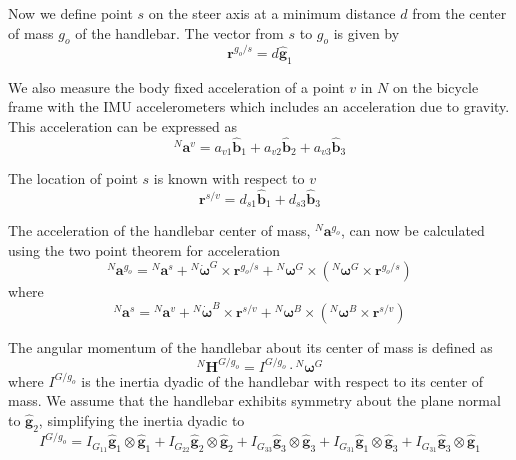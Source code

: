 \documentclass[10pt]{article}
\begin{document}
Now we define point $s$ on the steer axis at a minimum distance $d$ from the
center of mass $g_o$ of the handlebar. The vector from $s$ to $g_o$ is given by 
%
\begin{equation}
  \mathbf{r}^{g_o/s} = d\hat{\mathbf{g}}_1
\end{equation}

We also measure the body fixed acceleration of a point $v$ in $N$ on the
bicycle frame with the IMU accelerometers which includes an acceleration due to
gravity. This acceleration can be expressed as
%
\begin{equation}
  ^N\mathbf{a}^v =
    a_{v1}\hat{\mathbf{b}}_1 +
    a_{v2}\hat{\mathbf{b}}_2 +
    a_{v3}\hat{\mathbf{b}}_3
  \label{eq:acceleration-of-v}
\end{equation}

The location of point $s$ is known with respect to $v$ 
%
\begin{equation}
  \mathbf{r}^{s/v} = d_{s1}\hat{\mathbf{b}}_1 + d_{s3}\hat{\mathbf{b}}_3
\end{equation}

The acceleration of the handlebar center of mass, $^N\mathbf{a}^{g_o}$, can now
be calculated using the two point theorem for acceleration \cite{Kane1985}
%
\begin{equation}
  ^N\mathbf{a}^{g_o} = {}^N\mathbf{a}^s +
    {}^N\dot{\boldsymbol{\omega}}^G\times\mathbf{r}^{g_o/s} +
    {}^N\boldsymbol{\omega}^G\times({}^N\boldsymbol{\omega}^G\times\mathbf{r}^{g_o/s})
\end{equation}
where
\begin{equation}
  ^N\mathbf{a}^s = {}^N\mathbf{a}^v +
    {}^N\dot{\boldsymbol{\omega}}^B\times\mathbf{r}^{s/v} +
    {}^N\boldsymbol{\omega}^B\times({}^N\boldsymbol{\omega}^B\times\mathbf{r}^{s/v})
\end{equation}

The angular momentum of the handlebar about its center of mass is defined as
%
\begin{equation}
  ^N\mathbf{H}^{G/g_o} = I^{G/g_o} \cdot {}^N\boldsymbol{\omega}^G
\end{equation}
%
where $I^{G/g_o}$ is the inertia dyadic of the handlebar with respect to its
center of mass. We assume that the handlebar exhibits symmetry about the plane
normal to $\hat{\mathbf{g}}_2$, simplifying the inertia dyadic to
%
\begin{equation}
  I^{G/g_o} =
    I_{G_{11}} \hat{\mathbf{g}}_1 \otimes \hat{\mathbf{g}}_1 +
    I_{G_{22}} \hat{\mathbf{g}}_2 \otimes \hat{\mathbf{g}}_2 +
    I_{G_{33}} \hat{\mathbf{g}}_3 \otimes \hat{\mathbf{g}}_3 +
    I_{G_{31}} \hat{\mathbf{g}}_1 \otimes \hat{\mathbf{g}}_3 +
    I_{G_{31}} \hat{\mathbf{g}}_3 \otimes \hat{\mathbf{g}}_1
\end{equation}
\end{document}
